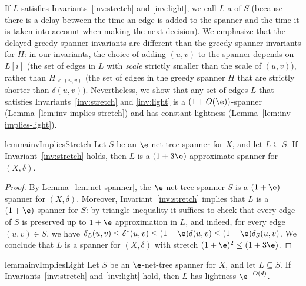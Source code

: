 \documentclass[11pt]{article}
\newcommand{\dist}{\ensuremath{\delta}}
\newcommand{\ddim}{\ensuremath{d}}
\begin{document}
If $L$ satisfies Invariants~\ref{inv:stretch} and \ref{inv:light}, we call $L$ a  of $S$
(because there is a delay between the time an edge is added to the spanner and the time it is taken into account when making the next decision). 
We emphasize that the delayed greedy spanner invariants are different than the greedy spanner invariants for $H$: in our invariants, the choice of adding $(u,v)$ to the spanner depends on $L[i]$ (the set of edges in $L$ with \emph{scale} strictly smaller than the scale of $(u,v)$), rather than $H_{<(u,v)}$ (the set of edges in the greedy spanner $H$ that are strictly shorter than $\dist(u,v)$). Nevertheless, we show that any set of edges $L$ that satisfies Invariants~\ref{inv:stretch} and \ref{inv:light} is a $(1+O(\e))$-spanner (Lemma~\ref{lem:inv-implies-stretch}) and has constant lightness (Lemma~\ref{lem:inv-implies-light}). 
% 
\begin{restatable}{lemma}{invImpliesStretch}
    \label{lem:inv-implies-stretch}
Let $S$ be an $\e$-net-tree spanner for $X$, and let $L \subseteq S$. 
If Invariant~\ref{inv:stretch} holds, then $L$ is a $(1+3 \e)$-approximate spanner for $(X, \dist)$.
\end{restatable}
\begin{proof}
    By Lemma~\ref{lem:net-spanner}, the $\e$-net-tree spanner $S$ is a $(1+\e)$-spanner for $(X, \dist)$. Moreover, Invariant~\ref{inv:stretch} implies that $L$ is a $(1+\e)$-spanner for $S$: by triangle inequality it suffices to check that every edge of $S$ is preserved up to $1+\e$ approximation in $L$, and indeed, for every edge $(u,v) \in S$, we have $\dist_L(u,v) \le \dist^*(u,v) \le (1+\e) \dist(u,v) \le (1+\e) \dist_S(u,v)$. We conclude that $L$ is a spanner for $(X,\delta)$ with stretch $(1+\e)^2 \le (1+3\e)$.
\end{proof}



% 
\begin{restatable}{lemma}{invImpliesLight}
\label{lem:inv-implies-light}
Let $S$ be an $\e$-net-tree spanner for $X$, and let $L \subseteq S$. If Invariants~\ref{inv:stretch} and \ref{inv:light} hold, then $L$ has lightness $\e^{-O(\ddim)}$.    
\end{restatable}
\end{document}
